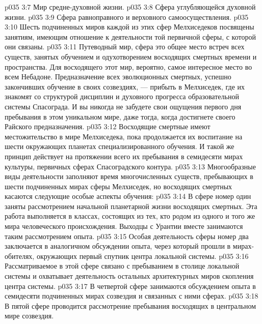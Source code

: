 \vs p035 3:7 \bibnobreakspace Мир средне\hyp{}духовной жизни.
\vs p035 3:8 \bibnobreakspace Сфера углубляющейся духовной жизни.
\vs p035 3:9 \bibnobreakspace Сфера равноправного и верховного самоосуществления.
\vs p035 3:10 \pc Шесть подчиненных миров каждой из этих сфер Мелхиседеков посвящены занятиям, имеющим отношение к деятельности той первичной сферы, с которой они связаны.
\vs p035 3:11 \pc Путеводный мир, сфера  это общее место встреч всех существ, занятых обучением и одухотворением восходящих смертных времени и пространства. Для восходящего этот мир, вероятно, самое интересное место во всем Небадоне. Предназначение всех эволюционных смертных, успешно закончивших обучение в своих созвездиях, --- прибыть в Мелхиседек, где их знакомят со структурой дисциплин и духовного прогресса образовательной системы Спасограда. И вы никогда не забудете свои ощущения первого дня пребывания в этом уникальном мире, даже тогда, когда достигнете своего Райского предназначения.
\vs p035 3:12 Восходящие смертные имеют местожительство в мире Мелхиседека, пока продолжается их воспитание на шести окружающих планетах специализированного обучения. И такой же принцип действует на протяжении всего их пребывания в семидесяти мирах культуры, первичных сферах Спасоградского контура.
\vs p035 3:13 \pc Многообразные виды деятельности заполняют время многочисленных существ, пребывающих в шести подчиненных мирах сферы Мелхиседек, но восходящих смертных касаются следующие особые аспекты обучения:
\vs p035 3:14 \pc {}\bibnobreakspace В сфере номер один заняты рассмотрением начальной планетарной жизни восходящих смертных. Эта работа выполняется в классах, состоящих из тех, кто родом из одного и того же мира человеческого происхождения. Выходцы с Урантии вместе занимаются таким рассмотрением опыта.
\vs p035 3:15 \pc {}\bibnobreakspace Особая деятельность сферы номер два заключается в аналогичном обсуждении опыта, через который прошли в мирах\hyp{}обителях, окружающих первый спутник центра локальной системы.
\vs p035 3:16 \pc {}\bibnobreakspace Рассматриваемое в этой сфере связано с пребыванием в столице локальной системы и охватывает деятельность остальных архитектурных миров скопления центра системы.
\vs p035 3:17 \pc {}\bibnobreakspace В четвертой сфере занимаются обсуждением опыта в семидесяти подчиненных мирах созвездия и связанных с ними сферах.
\vs p035 3:18 \pc {}\bibnobreakspace В пятой сфере проводится рассмотрение пребывания восходящих в центральном мире созвездия.
